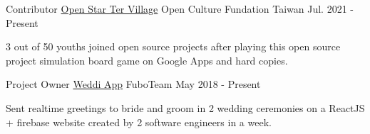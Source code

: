 

\begin{cventries}

  \cventry
  {Contributor} %
  {\href{https://github.com/ocftw/open-star-ter-village}{\faGithubSquare\acvHeaderIconSep Open Star Ter Village}} %
  {Open Culture Fundation Taiwan} %
  {Jul. 2021 - Present} %
  {
    \begin{cvitems} %
      \item {3 out of 50 youths joined open source projects after playing this open source project simulation board game on Google Apps and hard copies.}
    \end{cvitems}
  }

  \cventry
  {Project Owner} %
  {\href{https://github.com/fuboteam/weddi-app}{\faGithubSquare\acvHeaderIconSep Weddi App}} %
  {FuboTeam} %
  {May 2018 - Present} %
  {
    \begin{cvitems} %
      \item {Sent realtime greetings to bride and groom in 2 wedding ceremonies on a ReactJS + firebase website created by 2 software engineers in a week.}
    \end{cvitems}
  }

\end{cventries}
